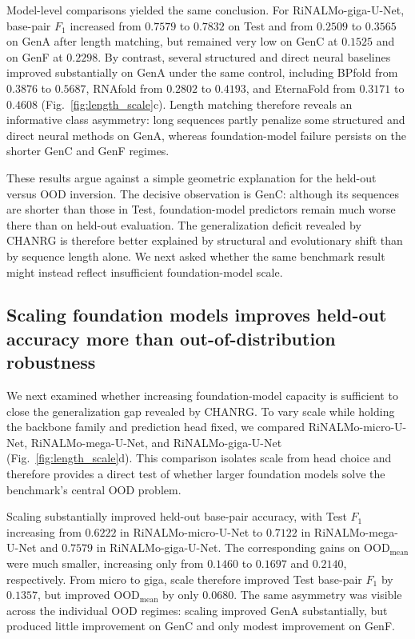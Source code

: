 \documentclass[pdflatex,sn-mathphys-num]{sn-jnl}%
\theoremstyle{thmstyleone}%
\theoremstyle{thmstyletwo}%
\theoremstyle{thmstylethree}%
\begin{document}
Model-level comparisons yielded the same conclusion.
For RiNALMo-giga-U-Net, base-pair $F_1$ increased from $0.7579$ to $0.7832$ on Test and from $0.2509$ to $0.3565$ on GenA after length matching, but remained very low on GenC at $0.1525$ and on GenF at $0.2298$.
By contrast, several structured and direct neural baselines improved substantially on GenA under the same control, including BPfold from $0.3876$ to $0.5687$, RNAfold from $0.2802$ to $0.4193$, and EternaFold from $0.3171$ to $0.4608$ (Fig.~\ref{fig:length_scale}c).
Length matching therefore reveals an informative class asymmetry: long sequences partly penalize some structured and direct neural methods on GenA, whereas foundation-model failure persists on the shorter GenC and GenF regimes.

These results argue against a simple geometric explanation for the held-out versus OOD inversion.
The decisive observation is GenC: although its sequences are shorter than those in Test, foundation-model predictors remain much worse there than on held-out evaluation.
The generalization deficit revealed by CHANRG is therefore better explained by structural and evolutionary shift than by sequence length alone.
We next asked whether the same benchmark result might instead reflect insufficient foundation-model scale.

\subsection{Scaling foundation models improves held-out accuracy more than out-of-distribution robustness}

We next examined whether increasing foundation-model capacity is sufficient to close the generalization gap revealed by CHANRG.
To vary scale while holding the backbone family and prediction head fixed, we compared RiNALMo-micro-U-Net, RiNALMo-mega-U-Net, and RiNALMo-giga-U-Net (Fig.~\ref{fig:length_scale}d).
This comparison isolates scale from head choice and therefore provides a direct test of whether larger foundation models solve the benchmark's central OOD problem.

Scaling substantially improved held-out base-pair accuracy, with Test $F_1$ increasing from $0.6222$ in RiNALMo-micro-U-Net to $0.7122$ in RiNALMo-mega-U-Net and $0.7579$ in RiNALMo-giga-U-Net.
The corresponding gains on $\mathrm{OOD}_{\mathrm{mean}}$ were much smaller, increasing only from $0.1460$ to $0.1697$ and $0.2140$, respectively.
From micro to giga, scale therefore improved Test base-pair $F_1$ by $0.1357$, but improved $\mathrm{OOD}_{\mathrm{mean}}$ by only $0.0680$.
The same asymmetry was visible across the individual OOD regimes: scaling improved GenA substantially, but produced little improvement on GenC and only modest improvement on GenF.
\end{document}
